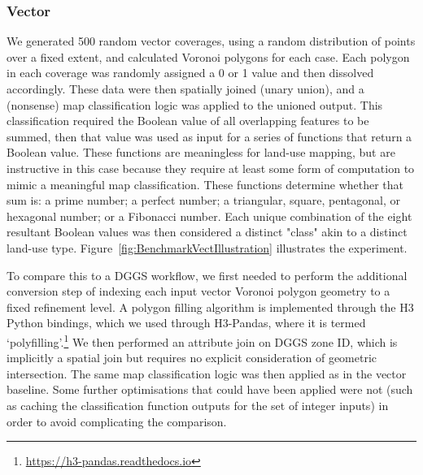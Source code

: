 \documentclass[]{interact}
\theoremstyle{plain}%
\theoremstyle{definition}
\theoremstyle{remark}
\begin{document}
\subsubsection{Vector}

We generated 500 random vector coverages, using a random distribution of points over a fixed extent, and calculated Voronoi polygons for each case. Each polygon in each coverage was randomly assigned a 0 or 1 value and then dissolved accordingly. These data were then spatially joined (unary union), and a (nonsense) map classification logic was applied to the unioned output. This classification required the Boolean value of all overlapping features to be summed, then that value was used as input for a series of functions that return a Boolean value. These functions are meaningless for land-use mapping, but are instructive in this case because they require at least some form of computation to mimic a meaningful map classification. These functions determine whether that sum is: a prime number; a perfect number; a triangular, square, pentagonal, or hexagonal number; or a Fibonacci number. Each unique combination of the eight resultant Boolean values was then considered a distinct "class" akin to a distinct land-use type. Figure~\ref{fig:BenchmarkVectIllustration} illustrates the experiment.

To compare this to a \ac{DGGS} workflow, we first needed to perform the additional conversion step of indexing each input vector Voronoi polygon geometry to a fixed refinement level. A polygon filling algorithm is implemented through the H3 Python bindings, which we used through H3-Pandas, where it is termed `polyfilling'.\footnote{\url{https://h3-pandas.readthedocs.io}} We then performed an attribute join on \ac{DGGS} zone ID, which is implicitly a spatial join but requires no explicit consideration of geometric intersection. The same map classification logic was then applied as in the vector baseline. Some further optimisations that could have been applied were not (such as caching the classification function outputs for the set of integer inputs) in order to avoid complicating the comparison.
\end{document}

